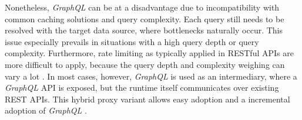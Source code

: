 Nonetheless, \textit{GraphQL} can be at a disadvantage due to incompatibility with common caching solutions and query complexity.
Each query still needs to be resolved with the target data source, where bottlenecks naturally occur.
This issue especially prevails in situations with a high query depth or query complexity.
Furthermore, rate limiting as typically applied in RESTful \acp{API} are more difficult to apply, because the query depth and complexity weighing can vary a lot \cite{Wieruch.2018}\cite{AltexSoft.2019}.
In most cases, however, \textit{GraphQL} is used as an intermediary, where a \textit{GraphQL} \ac{API} is exposed, but the runtime itself communicates over existing \ac{REST} \acp{API}.
This hybrid proxy variant allows easy adoption and a incremental adoption of \textit{GraphQL} \cite[p.~29]{Porcello.2018}.
